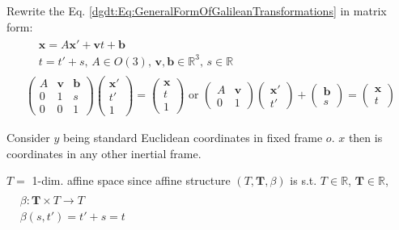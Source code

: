 Rewrite the Eq. \ref{dgdt:Eq:GeneralFormOfGalileanTransformations} in matrix form:
\[
\begin{gathered}
\begin{aligned}
& \mathbf{x} = A \mathbf{x}' + \mathbf{v} t + \mathbf{b} \\ 
& t = t'+ s, \, A \in O(3), \, \mathbf{v}, \mathbf{b} \in \mathbb{R}^3, \, s \in \mathbb{R}
\end{aligned} \\
\left( \begin{matrix} A & \mathbf{v} & \mathbf{b} \\ 0 & 1 & s \\ 0 & 0 & 1 \end{matrix} \right) \left(\begin{matrix} \mathbf{x}' \\ t' \\ 1 \end{matrix} \right) = \left( \begin{matrix} \mathbf{x} \\ t  \\ 1 \end{matrix} \right) \text{ or } \left( \begin{matrix} A & \mathbf{v} \\  0 & 1 \end{matrix} \right) \left( \begin{matrix}\mathbf{x}' \\ t' \end{matrix} \right) + \left( \begin{matrix} \mathbf{b} \\ s \end{matrix} \right) = \left(\begin{matrix} \mathbf{x} \\ t \end{matrix} \right)
\end{gathered}
\]

Consider $y$ being standard Euclidean coordinates in fixed frame $o$. $x$ then is coordinates in any other inertial frame.

$T =$ 1-dim. affine space since affine structure $(T, \mathbf{T}, \beta)$ is s.t. $T\in \mathbb{R}$, $\mathbf{T} \in \mathbb{R}$, $\begin{aligned} & \quad \\ 
& \beta : \mathbf{T} \times T \to T \\
& \beta(s,t') = t' + s = t\end{aligned}$ \\

